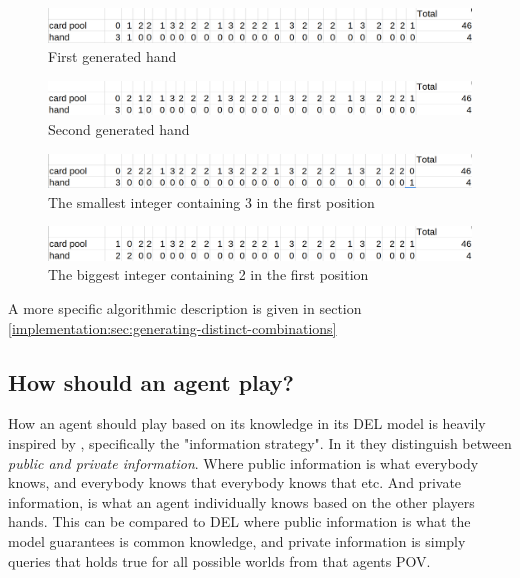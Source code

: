 \begin{figure}
	\centering
\includegraphics[width=13cm,frame]{images/biggest_integer.png}
	\caption{First generated hand}
	\label{fig:biggest-integer}
\end{figure}

\begin{figure}
	\centering
\includegraphics[width=13cm,frame]{images/next-biggest.png}
	\caption{Second generated hand}
	\label{fig:next-integer}
\end{figure}

\begin{figure}
	\centering
\includegraphics[width=13cm,frame]{images/etc_one.png}
	\caption{The smallest integer containing 3 in the first position}
	\label{fig:etc-one}
\end{figure}


\begin{figure}
	\centering
\includegraphics[width=13cm,frame]{images/decrement.png}
	\caption{The biggest integer containing 2 in the first position}
	\label{fig:decrement}
\end{figure}


A more specific algorithmic description is given in section \ref{implementation:sec:generating-distinct-combinations}

\subsection{How should an agent play?} \label{sec:how-should-an-agent-play}

How an agent should play based on its knowledge in its DEL model is heavily inspired by \cite{CoxEtAl2015}, specifically the "information strategy". 
In it they distinguish between \emph{public and private information}. Where public information is what everybody knows, and everybody knows that everybody knows that etc. And private information, is what an agent individually knows based on the other players hands. This can be compared to DEL where public information is what the model guarantees is common knowledge, and private information is simply queries that holds true for all possible worlds from that agents POV.

